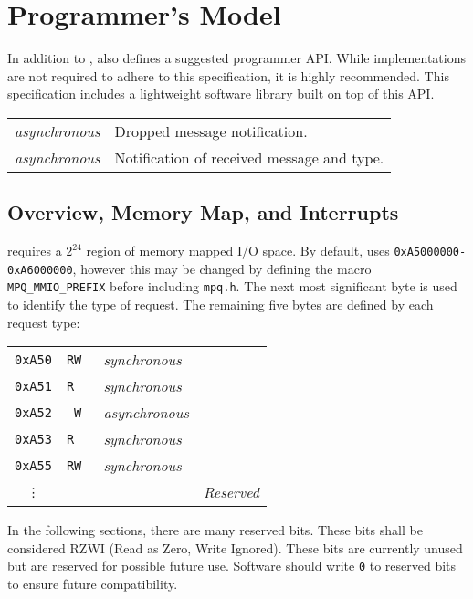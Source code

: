 \section{\proto Programmer's Model}
\label{sec:programmer}

In addition to \proto, \bus also defines a suggested programmer API. While
\proto implementations are not required to adhere to this specification, it is
highly recommended. This specification includes a lightweight software library
built on top of this API.

\begin{figure*}[!h]
\begin{tabular}{l l}
  {\em asynchronous} & Dropped message notification. \\
  {\em asynchronous} & Notification of received message and type. \\
\end{tabular}
\end{figure*}

\subsection{Overview, Memory Map, and Interrupts}
\proto requires a $2^{24}$ region of memory mapped I/O space. By default,
\proto uses {\tt 0xA5000000-0xA6000000}, however this may be changed by
defining the macro {\tt MPQ\_MMIO\_PREFIX} before including {\tt mpq.h}.
The next most significant byte is used to identify the type of request. The
remaining five bytes are defined by each request type:

\begin{tabular}{ c|c|l|l }
  {\tt 0xA50}  & \tt RW & {\em  synchronous} & \nameref{reg-conf} \\
  {\tt 0xA51}  & \tt R~ & {\em  synchronous} & \nameref{reg-int} \\
  {\tt 0xA52}  & \tt ~W & {\em asynchronous} & \nameref{reg-tx-multi} \\
  {\tt 0xA53}  & \tt R~ & {\em  synchronous} & \nameref{reg-tx-result} \\
  {\tt 0xA55}  & \tt RW & {\em  synchronous} & \nameref{reg-rx-multi} \\
  {\tt \vdots} & \tt ~~ &                    & \em Reserved \\
\end{tabular}

In the following sections, there are many reserved bits. These bits shall be
considered RZWI (Read as Zero, Write Ignored). These bits are currently
unused but are reserved for possible future use. Software should write {\tt 0}
to reserved bits to ensure future compatibility.

